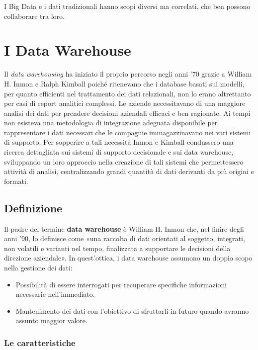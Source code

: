 I Big Data e i dati tradizionali hanno scopi diversi ma correlati, che ben possono collaborare tra loro.

\section{I Data Warehouse}

Il \textit{data warehousing} ha iniziato il proprio percorso negli anni '70 grazie a William H. Inmon e Ralph Kimball poiché ritenevano che i database basati sui modelli, per quanto efficienti nel trattamento dei dati relazionali, non lo erano altrettanto per casi di report analitici complessi. Le aziende necessitavano di una maggiore analisi dei dati per prendere decisioni aziendali efficaci e ben ragionate. Ai tempi non esisteva una metodologia di integrazione adeguata disponibile per rappresentare i dati necessari che le compagnie immagazzinavano nei vari sistemi di supporto.\cite{researchgate_data_warehouse}
Per sopperire a tali necessità Inmon e Kimball condussero una ricerca dettagliata sui sistemi di supporto decisionale e sui data warehouse, sviluppando un loro approccio nella creazione di tali sistemi che permettessero attività di analisi, centralizzando grandi quantità di dati derivanti da più origini e formati.

\subsection{Definizione}

Il padre del termine \textbf{data warehouse} è William H. Inmon che, nel finire degli anni '90, lo definisce come «una raccolta di dati orientati al soggetto, integrati, non volatili e varianti nel tempo, finalizzata a supportare le decisioni della direzione aziendale». In quest'ottica, i data warehouse assumono un doppio scopo nella gestione dei dati:\cite{inmon_building_the_data_warehouse}

\begin{itemize}
    \item Possibilità di essere interrogati per recuperare specifiche informazioni necessarie nell'immediato.
    \item Mantenimento dei dati con l'obiettivo di sfruttarli in futuro quando avranno assunto maggior valore.
\end{itemize}

\subsubsection{Le caratteristiche}

